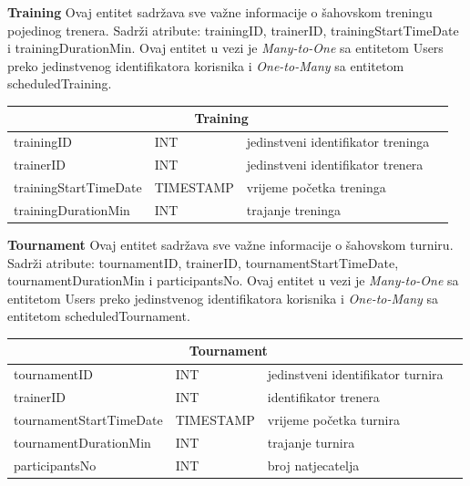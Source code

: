\documentclass{article}
\begin{document}
\textbf{Training} Ovaj entitet sadržava sve važne informacije o šahovskom treningu pojedinog trenera. Sadrži atribute: trainingID, trainerID, trainingStartTimeDate i trainingDurationMin. Ovaj entitet u vezi je \textit{Many-to-One} sa entitetom Users preko jedinstvenog identifikatora korisnika i \textit{One-to-Many} sa entitetom scheduledTraining.
		\\






  \begin{center}
    \begin{tabular}{ | l | l | l | p{5cm} |}
    \hline
    \multicolumn{3}{|c|}{Training}  \\ \hline
   \cellcolor{green!25}trainingID & INT & jedinstveni identifikator treninga \\ \hline  
   \cellcolor{blue!15}trainerID & INT & jedinstveni identifikator trenera \\ \hline
      trainingStartTimeDate  & TIMESTAMP & vrijeme početka treninga \\ \hline
    trainingDurationMin & INT & trajanje treninga \\ \hline
    \end{tabular}
\end{center}    
\bigskip
\bigskip
\bigskip


\textbf{Tournament} Ovaj entitet sadržava sve važne informacije o šahovskom turniru. Sadrži atribute: tournamentID, trainerID, tournamentStartTimeDate, tournamentDurationMin i participantsNo. Ovaj entitet u vezi je \textit{Many-to-One} sa entitetom Users preko jedinstvenog identifikatora korisnika i \textit{One-to-Many} sa entitetom scheduledTournament.
		\\
		
		
		

	\begin{center}
      \begin{tabular}{ | l | l | l | p{5cm} |}
    \hline
    \multicolumn{3}{|c|}{Tournament}  \\ \hline
    \cellcolor{green!25}tournamentID  & INT & jedinstveni identifikator turnira\\ \hline
    \cellcolor{blue!15}trainerID & INT & identifikator trenera \\ \hline
      tournamentStartTimeDate  &  TIMESTAMP  & vrijeme početka turnira \\ \hline
    tournamentDurationMin & INT & trajanje turnira\\\hline
    participantsNo   & INT & broj natjecatelja\\ \hline
    \end{tabular}
\end{center}
	\eject
	
\end{document}
